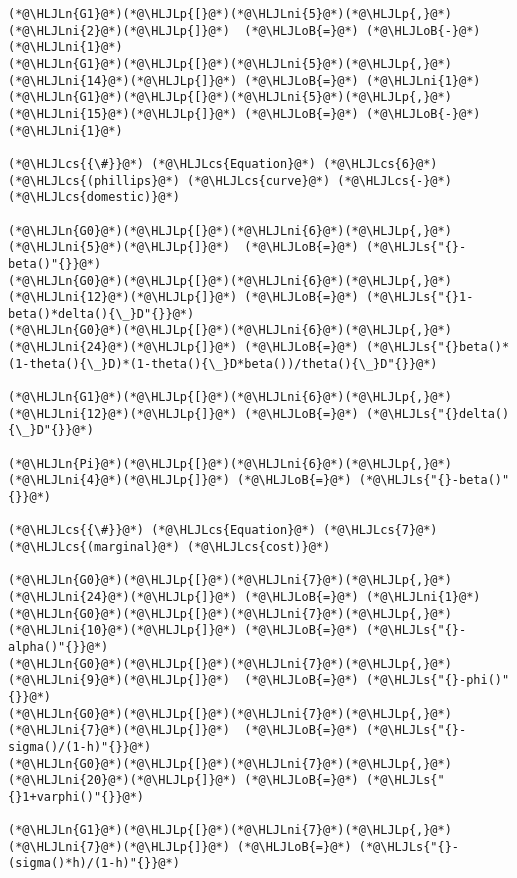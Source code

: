 \documentclass[12pt,a4paper]{article}
\newcommand{\HLJLn}[1]{#1}
\newcommand{\HLJLs}[1]{\textcolor[RGB]{201,61,57}{#1}}
\newcommand{\HLJLni}[1]{\textcolor[RGB]{59,151,46}{#1}}
\newcommand{\HLJLoB}[1]{\textcolor[RGB]{102,102,102}{\textbf{#1}}}
\newcommand{\HLJLp}[1]{#1}
\newcommand{\HLJLcs}[1]{\textcolor[RGB]{153,153,119}{\textit{#1}}}
\begin{document}
\begin{lstlisting}
(*@\HLJLn{G1}@*)(*@\HLJLp{[}@*)(*@\HLJLni{5}@*)(*@\HLJLp{,}@*)(*@\HLJLni{2}@*)(*@\HLJLp{]}@*)  (*@\HLJLoB{=}@*) (*@\HLJLoB{-}@*)(*@\HLJLni{1}@*)
(*@\HLJLn{G1}@*)(*@\HLJLp{[}@*)(*@\HLJLni{5}@*)(*@\HLJLp{,}@*)(*@\HLJLni{14}@*)(*@\HLJLp{]}@*) (*@\HLJLoB{=}@*) (*@\HLJLni{1}@*)
(*@\HLJLn{G1}@*)(*@\HLJLp{[}@*)(*@\HLJLni{5}@*)(*@\HLJLp{,}@*)(*@\HLJLni{15}@*)(*@\HLJLp{]}@*) (*@\HLJLoB{=}@*) (*@\HLJLoB{-}@*)(*@\HLJLni{1}@*)

(*@\HLJLcs{{\#}}@*) (*@\HLJLcs{Equation}@*) (*@\HLJLcs{6}@*) (*@\HLJLcs{(phillips}@*) (*@\HLJLcs{curve}@*) (*@\HLJLcs{-}@*) (*@\HLJLcs{domestic)}@*)

(*@\HLJLn{G0}@*)(*@\HLJLp{[}@*)(*@\HLJLni{6}@*)(*@\HLJLp{,}@*)(*@\HLJLni{5}@*)(*@\HLJLp{]}@*)  (*@\HLJLoB{=}@*) (*@\HLJLs{"{}-beta()"{}}@*)
(*@\HLJLn{G0}@*)(*@\HLJLp{[}@*)(*@\HLJLni{6}@*)(*@\HLJLp{,}@*)(*@\HLJLni{12}@*)(*@\HLJLp{]}@*) (*@\HLJLoB{=}@*) (*@\HLJLs{"{}1-beta()*delta(){\_}D"{}}@*)
(*@\HLJLn{G0}@*)(*@\HLJLp{[}@*)(*@\HLJLni{6}@*)(*@\HLJLp{,}@*)(*@\HLJLni{24}@*)(*@\HLJLp{]}@*) (*@\HLJLoB{=}@*) (*@\HLJLs{"{}beta()*(1-theta(){\_}D)*(1-theta(){\_}D*beta())/theta(){\_}D"{}}@*)

(*@\HLJLn{G1}@*)(*@\HLJLp{[}@*)(*@\HLJLni{6}@*)(*@\HLJLp{,}@*)(*@\HLJLni{12}@*)(*@\HLJLp{]}@*) (*@\HLJLoB{=}@*) (*@\HLJLs{"{}delta(){\_}D"{}}@*)

(*@\HLJLn{Pi}@*)(*@\HLJLp{[}@*)(*@\HLJLni{6}@*)(*@\HLJLp{,}@*)(*@\HLJLni{4}@*)(*@\HLJLp{]}@*) (*@\HLJLoB{=}@*) (*@\HLJLs{"{}-beta()"{}}@*)

(*@\HLJLcs{{\#}}@*) (*@\HLJLcs{Equation}@*) (*@\HLJLcs{7}@*) (*@\HLJLcs{(marginal}@*) (*@\HLJLcs{cost)}@*)

(*@\HLJLn{G0}@*)(*@\HLJLp{[}@*)(*@\HLJLni{7}@*)(*@\HLJLp{,}@*)(*@\HLJLni{24}@*)(*@\HLJLp{]}@*) (*@\HLJLoB{=}@*) (*@\HLJLni{1}@*)
(*@\HLJLn{G0}@*)(*@\HLJLp{[}@*)(*@\HLJLni{7}@*)(*@\HLJLp{,}@*)(*@\HLJLni{10}@*)(*@\HLJLp{]}@*) (*@\HLJLoB{=}@*) (*@\HLJLs{"{}-alpha()"{}}@*)
(*@\HLJLn{G0}@*)(*@\HLJLp{[}@*)(*@\HLJLni{7}@*)(*@\HLJLp{,}@*)(*@\HLJLni{9}@*)(*@\HLJLp{]}@*)  (*@\HLJLoB{=}@*) (*@\HLJLs{"{}-phi()"{}}@*)
(*@\HLJLn{G0}@*)(*@\HLJLp{[}@*)(*@\HLJLni{7}@*)(*@\HLJLp{,}@*)(*@\HLJLni{7}@*)(*@\HLJLp{]}@*)  (*@\HLJLoB{=}@*) (*@\HLJLs{"{}-sigma()/(1-h)"{}}@*)
(*@\HLJLn{G0}@*)(*@\HLJLp{[}@*)(*@\HLJLni{7}@*)(*@\HLJLp{,}@*)(*@\HLJLni{20}@*)(*@\HLJLp{]}@*) (*@\HLJLoB{=}@*) (*@\HLJLs{"{}1+varphi()"{}}@*)

(*@\HLJLn{G1}@*)(*@\HLJLp{[}@*)(*@\HLJLni{7}@*)(*@\HLJLp{,}@*)(*@\HLJLni{7}@*)(*@\HLJLp{]}@*) (*@\HLJLoB{=}@*) (*@\HLJLs{"{}-(sigma()*h)/(1-h)"{}}@*)


\end{lstlisting}
\end{document}
